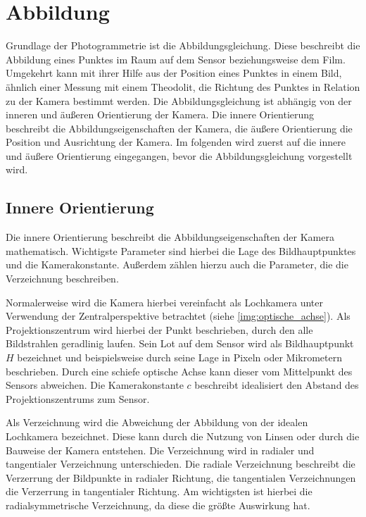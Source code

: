 \documentclass[./00PhotoBox.tex]{subfiles}
\begin{document}
\section{Abbildung}

Grundlage der Photogrammetrie ist die Abbildungsgleichung. Diese beschreibt die Abbildung eines Punktes im Raum auf dem Sensor beziehungsweise dem Film. Umgekehrt kann mit ihrer Hilfe aus der Position eines Punktes in einem Bild, ähnlich einer Messung mit einem Theodolit, die Richtung des Punktes in Relation zu der Kamera bestimmt werden. Die Abbildungsgleichung ist abhängig von der inneren und äußeren Orientierung der Kamera. Die innere Orientierung beschreibt die Abbildungseigenschaften der Kamera, die äußere Orientierung die Position und Ausrichtung der Kamera. Im folgenden wird zuerst auf die innere und äußere Orientierung eingegangen, bevor die Abbildungsgleichung vorgestellt wird.

\subsection{Innere Orientierung}
\label{s:innereorientierung}
Die innere Orientierung beschreibt die Abbildungseigenschaften der Kamera mathematisch. Wichtigste Parameter sind hierbei die Lage des Bildhauptpunktes und die Kamerakonstante. Außerdem zählen hierzu auch die Parameter, die die Verzeichnung beschreiben. \citep[S. 179f]{luhmann}

Normalerweise wird die Kamera hierbei vereinfacht als Lochkamera unter Verwendung der Zentralperspektive betrachtet (siehe \autoref{img:optische_achse}). Als Projektionszentrum wird hierbei der Punkt beschrieben, durch den alle Bildstrahlen geradlinig laufen. Sein Lot auf dem Sensor wird als Bildhauptpunkt $H$ bezeichnet und beispielsweise durch seine Lage in Pixeln oder Mikrometern beschrieben. Durch eine schiefe optische Achse kann dieser vom Mittelpunkt des Sensors abweichen. Die Kamerakonstante $c$ beschreibt idealisiert den Abstand des Projektionszentrums zum Sensor. \citep[S. 177]{luhmann}

Als Verzeichnung wird die Abweichung der Abbildung von der idealen Lochkamera bezeichnet. Diese kann durch die Nutzung von Linsen oder durch die Bauweise der Kamera entstehen. Die Verzeichnung wird in radialer und tangentialer Verzeichnung unterschieden. Die radiale Verzeichnung beschreibt die Verzerrung der Bildpunkte in radialer Richtung, die tangentialen Verzeichnungen die Verzerrung in tangentialer Richtung. Am wichtigsten ist hierbei die radialsymmetrische Verzeichnung, da diese die größte Auswirkung hat. \citep[S. 178]{luhmann}
\end{document}
